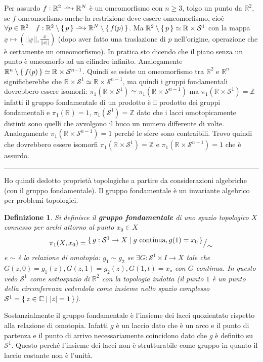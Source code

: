 \documentclass[10pt, twoside=false, x11names]{scrbook}
\newtheorem{definition}[theorem]{Definizione}
\newenvironment{proof}{{\textbf{Dimostrazione}:}}{\hfill\rule{2mm}{2mm} \newline}
\newcommand{\Z}{\mathbb{Z}}
\newcommand{\RN}[1][]{\mathbb{R}^#1}
\newcommand{\Sph}[1][]{\mathcal{S}^#1}
\newcommand{\homoto}{\xrightarrow{\,\smash{\raisebox{-0.65ex}{\ensuremath{\scriptstyle\sim}}}\,}}
\newcommand*\quot[2]{{^{\textstyle #1}\big/_{\textstyle #2}}}
\begin{document}
\newmathsymb{homoto}{\homoto}{Omeomorfismo}
\begin{proof}
  Per assurdo $ f : \RN{2} \homoto \RN{N} $ è un omeomorfismo con
  $ n \geq 3 $, tolgo un punto da $ \RN{2} $, se $ f $ omeomorfismo anche la restrizione deve essere omeomorfismo, cioè
  $ \forall p \in \RN{2} \quad f:\RN{2} \setminus \set{p} \homoto \RN{N} \setminus \set{f(p)} $.
  Ma $ \RN{2} \setminus \set{p} \simeq \RN{} \times \mathcal{S}^1 $ con la mappa
  $ \underline{x} \mapsto \left( || \underline{x} ||, \frac{\underline{x}}{|| \underline{x} ||} \right) $ (dopo aver fatto
  una traslazione di $ p $ nell'origine, operazione che è certamente un omeomorfismo). In pratica
  sto dicendo che il piano senza un punto è omeomorfo ad un cilindro infinito.
  Analogamente $ \RN{n} \setminus \set{f(p)} \simeq \RN{} \times \Sph{n-1} $. Quindi se esiste un omeomorfismo tra $ \RN{2} $ e
  $ \RN{n} $ significherebbe che $ \RN{} \times \Sph{1} \simeq \RN{} \times \Sph{n-1} $, ma quindi i gruppi fondamentali
  dovrebbero essere isomorfi:
  $ \pi_1 (\RN{} \times \Sph{1}) \simeq \pi_1(\RN{}\times \Sph{n-1}) $ ma
  $ \pi_1 (\RN{} \times \Sph{1}) = \Z $ infatti il gruppo fondamentale di un prodotto è il prodotto dei gruppi
  fondamentali e $ \pi_1(\RN{}) = 1 $, $ \pi_1(\Sph{1}) = \Z $ dato che i lacci omotopicamente distinti
  sono quelli che avvolgono il buco un numero differente di volte. Analogamente $ \pi_1(\RN{}\times \Sph{n-1}) = 1 $
  perché le sfere sono contraibili. Trovo quindi che dovrebbero essere isomorfi $ \pi_1 (\RN{} \times \Sph{1}) = \Z $
  e $ \pi_1(\RN{}\times \Sph{n-1}) = 1 $ che è assurdo.
\end{proof}

Ho quindi dedotto proprietà topologiche a partire da considerazioni algebriche (con il gruppo fondamentale).
Il gruppo fondamentale è un invariante algebrico per problemi topologici.

\begin{definition}
  Si definisce il \textbf{gruppo fondamentale} di uno spazio topologico $ X $
  connesso per archi attorno al punto $ x_0 \in X $
  \[
    \pi_1 (X, x_0) = \quot{\set{ g: \Sph{1} \to X | g \text{ continua}, g(1) = x_0}}{\sim}
  \]
  e $ \sim $ è la relazione di omotopia: $ g_1 \sim g_2 $ se $ \exists G: \mathcal{S}^1 \times I \to X  $ tale che
  $ G(z,0) = g_1(z), G(z,1) = g_2(z), G(1,t) = x_o $ con $ G $ continua. In questo vedo $ \Sph{1} $ come sottospazio
  di $ \RN{2} $ con la topologia indotta (il punto $ 1 $ è un punto della circonferenza vedendola come
  insieme nello spazio complesso $ \Sph{1} = \set{ z \in \mathbb{C} | |z| = 1} $).
\end{definition}
Sostanzialmente il gruppo fondamentale è l'insieme dei lacci quozientato rispetto alla relazione di omotopia.
Infatti $ g $ è un laccio dato che è un arco e il punto di partenza e il punto di arrivo necessariamente
coincidono dato che $ g $ è definito su $ \Sph{1} $.
Questo perché l'insieme dei lacci non è strutturabile come gruppo in quanto il laccio costante non è
l'unità.
\end{document}

